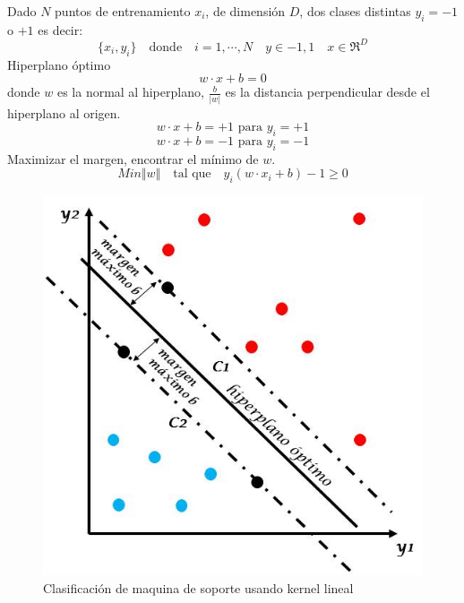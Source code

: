 Dado $N$ puntos de entrenamiento $x_i$, de dimensión $D$, dos clases distintas $y_i=-1$
o $+1$ es decir: 
$$\lbrace x_i,y_i \rbrace \quad \text{donde} \quad  i=1, \cdots ,N \quad y\in{-1,1} \quad x \in \Re^D$$  
Hiperplano óptimo  
$$ w \cdot x + b = 0$$ 
donde $w$ es la normal al hiperplano, $\frac{b}{|w|}$ es la distancia perpendicular desde el hiperplano al origen.   
$$ w \cdot x + b = +1 \textrm{ para } y_i=+1$$ 
$$ w \cdot x + b = -1 \textrm{ para } y_i=-1$$ 
Maximizar el margen, encontrar el mínimo de $w$.  
$$Min\Vert w \Vert \quad \text{tal que} \quad y_i(w \cdot x_i + b) -1 \geq 0$$
\begin{figure}[h!]
\begin{center}
\includegraphics[scale=.3]{./Figures/maquinaSoporte.jpg}
\end{center}
\caption{Clasificación de maquina de soporte usando kernel lineal}
\label{fig:SVM}
\end{figure} 


\newpage
